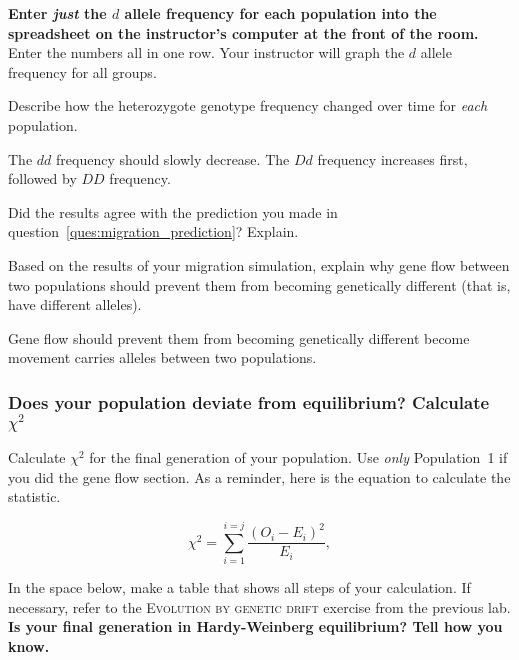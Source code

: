 \documentclass[12pt, hidelinks]{exam}
\newcommand*\AnswerBox[2]{%
    \parbox[t][#1]{0.92\textwidth}{%
    \begin{solution}#2\end{solution}}
    \vspace{\stretch{1}}
}
\newlength{\basespace}
\newcommand{\allele}[1]{$#1$}
\begin{document}
\begin{questions}
\begin{enumerate}
\end{enumerate}

\question
\textbf{Enter \emph{just} the \allele{d} allele frequency for each population into the spreadsheet on the instructor's
computer at the front of the room.}  Enter the numbers all 
in one row. Your instructor will graph the \allele{d} allele frequency for 
all groups.



\question
Describe how the heterozygote genotype frequency changed over time for \emph{each} population.

\AnswerBox{0.5\basespace}{The \allele{dd} frequency should slowly decrease. The \allele{Dd} frequency increases first, followed by \allele{DD} frequency.}

\question
Did the results agree with the prediction you made in question~\ref{ques:migration_prediction}? Explain.

\AnswerBox{0.1\basespace}{%
}

\question[Checkout]
Based on the results of your migration simulation, explain why gene flow between two populations should prevent them from becoming genetically different (that is, have different alleles).

\AnswerBox{4\baselineskip}{Gene flow should prevent them from becoming genetically different become movement carries alleles between two populations.}


\subsubsection*{Does your population deviate from equilibrium? Calculate $\chi^2$}\label{sec:chi_square}

\question[Checkout] \label{ques:chi-square}
Calculate $\chi^2$ for the final generation of your population. Use \emph{only} Population~1 if you did the gene flow section. As a reminder, here is the equation to calculate the statistic.

\[\chi^2 = \sum_{i=1}^{i=j}\frac{(O_i - E_i)^2}{E_i}, \]

In the space below, make a table that shows all steps of your calculation. If necessary, refer to the \textsc{Evolution by genetic drift} exercise from the previous lab. \textbf{Is your final generation in Hardy-Weinberg equilibrium? Tell how you know.}

\AnswerBox{4\basespace}{%
}
\newpage


\end{questions}
\end{document}
